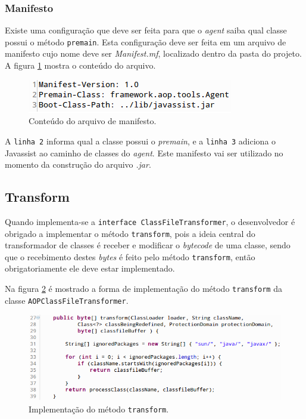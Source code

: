 \documentclass[tc,oneside]{iiufrgs}
\begin{document}
\subsubsection{Manifesto}

Existe uma configuração que deve ser feita para que o \textit{agent} saiba qual classe possui o método \texttt{premain}. Esta configuração deve ser feita em um arquivo de manifesto cujo nome deve ser \textit{Manifest.mf}, localizado dentro da pasta do projeto.  
A figura \ref{fig:manifest} mostra o conteúdo do arquivo.

\begin{figure}[ht]
	\centering
	\includegraphics[scale=0.7]{figuras/implementacao/manifesto.png}
	\caption{Conteúdo do arquivo de manifesto.}
	\label{fig:manifest}
\end{figure}

A \texttt{linha 2} informa qual a classe possui o \textit{premain}, e a \texttt{linha 3} adiciona o Javassist ao caminho de classes do \textit{agent}. Este manifesto vai ser utilizado no momento da construção do arquivo \textit{.jar}.

\subsection{Transform}

Quando implementa-se a \texttt{interface ClassFileTransformer}, o desenvolvedor é obrigado a implementar o método \texttt{transform}, pois a ideia central do transformador de classes é receber e modificar o \textit{bytecode} de uma classe, sendo que o recebimento destes \textit{bytes} é feito pelo método \texttt{transform}, então obrigatoriamente ele deve estar implementado.

Na figura \ref{fig:transform} é mostrado a forma de implementação do método \texttt{transform} da classe \texttt{AOPClassFileTransformer}.

\begin{figure}[ht]
	\centering
	\includegraphics[scale=0.6]{figuras/implementacao/transform.png}
	\caption{Implementação do método \texttt{transform}.}
	\label{fig:transform}
\end{figure}
\end{document}
